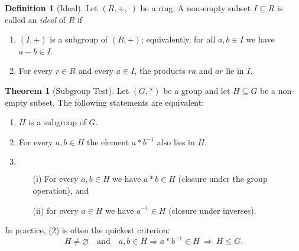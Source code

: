 \documentclass[12pt]{article}
\theoremstyle{definition} %
\newtheorem{theorem}{Theorem}
\newtheorem{definition}{Definition}
\theoremstyle{plain} %
\begin{document}
      \begin{definition}[Ideal]
        Let $(R,+,\cdot)$ be a ring.  
        A non‑empty subset $I \subseteq R$ is called an \emph{ideal} of $R$ if  
        \begin{enumerate}
          \item $(I,+)$ is a subgroup of $(R,+)$; equivalently, for all $a,b \in I$ we have $a - b \in I$.
          \item For every $r \in R$ and every $a \in I$, the products $ra$ and $ar$ lie in $I$.  
        \end{enumerate}
      \end{definition}
      \begin{theorem}[Subgroup Test]
        Let $(G,\ast)$ be a group and let $H\subseteq G$ be a non‐empty subset.
        The following statements are equivalent:
        \begin{enumerate}
          \item $H$ is a subgroup of $G$.
          \item For every $a,b\in H$ the element $a\ast b^{-1}$ also lies in $H$.
          \item $\;$\begin{enumerate}
                    \item[(i)] For every $a,b\in H$ we have $a\ast b\in H$ (closure under the group
                              operation), and
                    \item[(ii)] for every $a\in H$ we have $a^{-1}\in H$ (closure under inverses).
                 \end{enumerate}
        \end{enumerate}
        In practice, (2) is often the quickest criterion:  
        \[
          H\neq\varnothing\quad\text{and}\quad a,b\in H\Longrightarrow a\ast b^{-1}\in H
          \ \Longrightarrow\ H\le G .
        \]
      \end{theorem}
\end{document}
